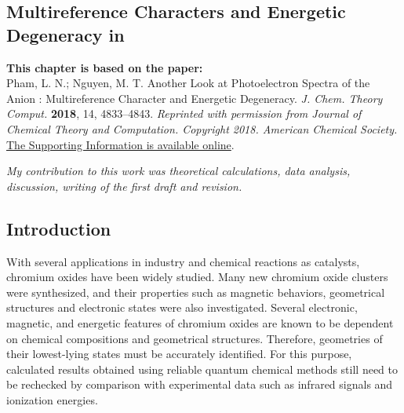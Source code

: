 
\begin{refsection}

\chapter[Dichromium oxide \ch{C\lowercase{r}2O2}]{Multireference Characters and Energetic Degeneracy in } \label{Cr2O2}


\begin{shaded}
\textbf{This chapter is based on the paper:}\\
Pham, L. N.; Nguyen, M. T. Another Look at Photoelectron Spectra of the Anion : Multireference Character and Energetic Degeneracy.  \textit{J. Chem. Theory Comput.} \textbf{2018}, 14, 4833–4843. \textit{Reprinted with permission from Journal of Chemical Theory and Computation. Copyright 2018. American Chemical Society.} \textcolor{blue}{\href{https://pubs.acs.org/doi/suppl/10.1021/acs.jctc.8b00412/suppl_file/ct8b00412_si_001.pdf}{The Supporting Information is available online}}.

\emph{My contribution to this work was theoretical calculations, data analysis, discussion, writing of the first draft and revision.}
\newpage
\end{shaded}


\section{Introduction}


With several applications in industry\cite{lunk15,mcdaniel10} and chemical reactions as catalysts,\cite{Rivalta06,Maeda07,zhang09} chromium oxides have been widely studied. Many new chromium oxide clusters were synthesized,\cite{Tono2003B, Tono2003, Janssens07, banobre03, Gutsev01, Zhai06, Zhai08, George97, Moriyama17} and their properties such as magnetic behaviors, geometrical structures and electronic states were also investigated. \cite{Tono2003B, Tono2003, Reddy99, GutsevCr2On, Veliah98, Janssens07, banobre03, Moriyama17} Several electronic, magnetic, and energetic features of chromium oxides are known to be dependent on chemical compositions and geometrical structures. Therefore, geometries of their lowest-lying states must be accurately identified. For this purpose, calculated results obtained using reliable quantum chemical methods still need to be rechecked by comparison with experimental data such as infrared signals and ionization energies. 





\end{refsection}
